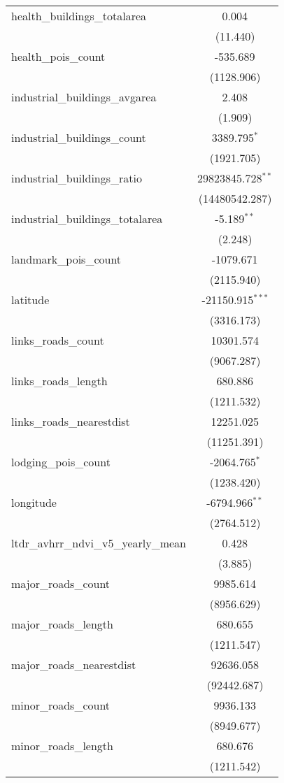 \begin{table}[!htbp]
\begin{tabular}{@{\extracolsep{5pt}}lc}
 health_buildings_totalarea & 0.004$^{}$ \\
  & (11.440) \\
 health_pois_count & -535.689$^{}$ \\
  & (1128.906) \\
 industrial_buildings_avgarea & 2.408$^{}$ \\
  & (1.909) \\
 industrial_buildings_count & 3389.795$^{*}$ \\
  & (1921.705) \\
 industrial_buildings_ratio & 29823845.728$^{**}$ \\
  & (14480542.287) \\
 industrial_buildings_totalarea & -5.189$^{**}$ \\
  & (2.248) \\
 landmark_pois_count & -1079.671$^{}$ \\
  & (2115.940) \\
 latitude & -21150.915$^{***}$ \\
  & (3316.173) \\
 links_roads_count & 10301.574$^{}$ \\
  & (9067.287) \\
 links_roads_length & 680.886$^{}$ \\
  & (1211.532) \\
 links_roads_nearestdist & 12251.025$^{}$ \\
  & (11251.391) \\
 lodging_pois_count & -2064.765$^{*}$ \\
  & (1238.420) \\
 longitude & -6794.966$^{**}$ \\
  & (2764.512) \\
 ltdr_avhrr_ndvi_v5_yearly_mean & 0.428$^{}$ \\
  & (3.885) \\
 major_roads_count & 9985.614$^{}$ \\
  & (8956.629) \\
 major_roads_length & 680.655$^{}$ \\
  & (1211.547) \\
 major_roads_nearestdist & 92636.058$^{}$ \\
  & (92442.687) \\
 minor_roads_count & 9936.133$^{}$ \\
  & (8949.677) \\
 minor_roads_length & 680.676$^{}$ \\
  & (1211.542) \\

\end{tabular}
\end{table}
